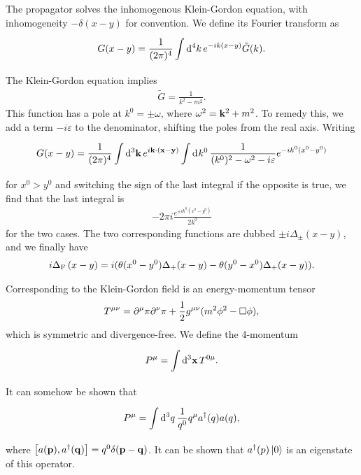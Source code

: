 The propagator solves the inhomogenous Klein-Gordon equation, with inhomogeneity $-\delta(x - y)$ for convention. We define its Fourier transform as
\begin{align*}
	G(x - y) = \frac{1}{(2\pi)^{4}}\int\limits_{}^{}\dd[4]{k}e^{-ik(x - y)}\tilde{G}(k).
\end{align*}
The Klein-Gordon equation implies
\begin{align*}
	\tilde{G} = \frac{1}{k^{2} - m^{2}}.
\end{align*}
This function has a pole at $k^{0} = \pm \omega$, where $\omega^{2} = \vb{k}^{2} + m^{2}$. To remedy this, we add a term $-i\varepsilon$ to the denominator, shifting the poles from the real axis. Writing
\begin{align*}
	G(x - y) = \frac{1}{(2\pi)^{4}}\int\limits_{}^{}\dd[3]{\vb{k}}e^{i\vb{k}\cdot(\vb{x} - \vb{y})}\int\limits_{}^{}\dd[]{k^{0}}\frac{1}{(k^{0})^{2} - \omega^{2} - i\varepsilon}e^{-ik^{0}(x^{0} - y^{0})}
\end{align*}
for $x^{0} > y^{0}$ and switching the sign of the last integral if the opposite is true, we find that the last integral is
\begin{align}
	-2\pi i\frac{e^{\pm ik^{0}(x^{0} - y^{0})}}{2k^{0}}
\end{align}
for the two cases. The two corresponding functions are dubbed $\pm i\Delta_{\pm}(x - y)$, and we finally have
\begin{align*}
	i\Delta_{\text{F}}\left(x - y\right) = i(\theta(x^{0} - y^{0})\Delta_{+}(x - y) - \theta(y^{0} - x^{0})\Delta_{+}(x - y)).
\end{align*}

Corresponding to the Klein-Gordon field is an energy-momentum tensor
\begin{align*}
	T^{\mu\nu} = \partial^{\mu}_{}{\pi}\partial^{\nu}_{}{\pi} + \frac{1}{2}g^{\mu\nu}(m^{2}\phi^{2} - \square \phi),
\end{align*}
which is symmetric and divergence-free. We define the 4-momentum
\begin{align*}
	P^{\mu} = \int\limits_{}^{}\dd[3]{\vb{x}}T^{0\mu}.
\end{align*}
It can somehow be shown that
\begin{align*}
	P^{\mu} = \int\limits_{}^{}\dd[3]{q}\frac{1}{q^{0}}q^{\mu}a^{\dagger}(q)a(q),
\end{align*}
where $\comm{a(\vb{p})}{a\adj(\vb{q})} = q^{0}\delta(\vb{p} - \vb{q})$. It can be shown that $a^{\dagger}(p)\ket{0}$ is an eigenstate of this operator.

